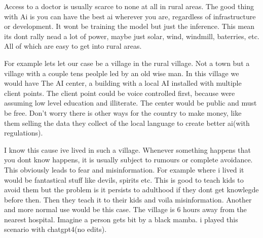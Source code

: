 Access to a doctor is usually scarce to none at all in rural areas. The good thing with Ai is you can have the best ai wherever you are, regardless of infrastructure or development. It wont be training the model but just the inference. This mean its dont rally nead a lot of power, maybe just solar, wind, windmill, baterries, etc. All of which are easy to get into rural areas.

For example lets let our case be a village in the rural village. Not a town but a village with a couple tens peolple led by an old wise man. In this village we would have The AI center, a building with a local AI installed with multiple client points. The client point could be voice controlled first, because were assuming low level education and illiterate. The center would be public and must be free. Don't worry there is other ways for the country to make money, like them selling the data they collect of the local language to create better ai(with regulations). 

I know this cause ive lived in such a village. Whenever something happens that you dont know happens, it is usually subject to rumours or complete avoidance. This obviously leads to fear and misinformation. For example where i lived it would be fantastical stuff like devils, spirits etc. This is good to teach kids to avoid them but the problem is it persists to adulthood if they dont get knowlegde before then. Then they teach it to their kids and voila misinformation.
Another and more normal use would be this case. The village is 6 hours away from the nearest hospital. Imagine a person gets bit by a black mamba. i played this scenario with chatgpt4(no edits).



